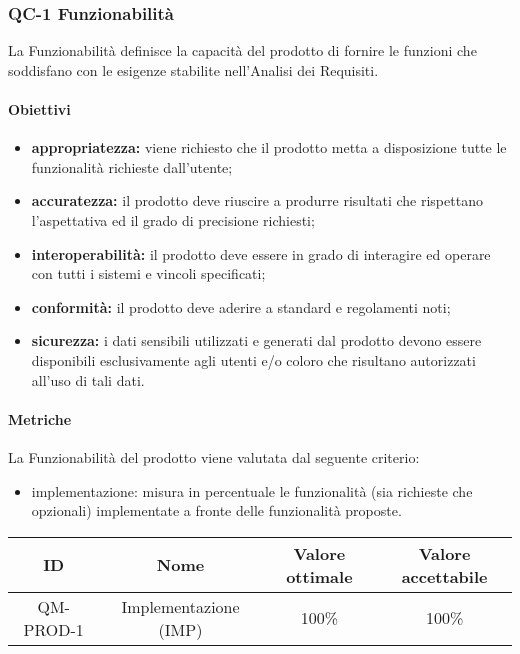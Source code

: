 \subsubsection{QC-1 Funzionabilità}
	La Funzionabilità definisce la capacità del prodotto di fornire le funzioni che soddisfano con le esigenze stabilite nell'Analisi dei Requisiti.
	\paragraph{Obiettivi}
		\begin{itemize}
			\item \textbf{appropriatezza:} viene richiesto che il prodotto metta a disposizione tutte le funzionalità richieste dall'utente;
			\item \textbf{accuratezza:} il prodotto deve riuscire a produrre risultati che rispettano l'aspettativa ed il grado di precisione richiesti;
			\item \textbf{interoperabilità:} il prodotto deve essere in grado di interagire ed operare con tutti i sistemi e vincoli specificati;
			\item \textbf{conformità:} il prodotto deve aderire a standard e regolamenti noti;
			\item \textbf{sicurezza:} i dati sensibili utilizzati e generati dal prodotto devono essere disponibili esclusivamente agli utenti e/o coloro che risultano autorizzati all'uso di tali dati.
		\end{itemize}
	\paragraph{Metriche}
	La Funzionabilità del prodotto viene valutata dal seguente criterio:
	\begin{itemize}
		\item implementazione: misura in percentuale le funzionalità (sia richieste che opzionali) implementate a fronte delle funzionalità proposte.
	\end{itemize}
	\begin{center}
		\begin{tabular}{|c|c|c|c|}
			\rowcolor{lighter-grayer}
			\hline
			ID & Nome & Valore ottimale & Valore accettabile \\
			\hline
			QM-PROD-1 & Implementazione (IMP)  & 100\% & 100\% \\
			\hline
		\end{tabular}
	\end{center}
